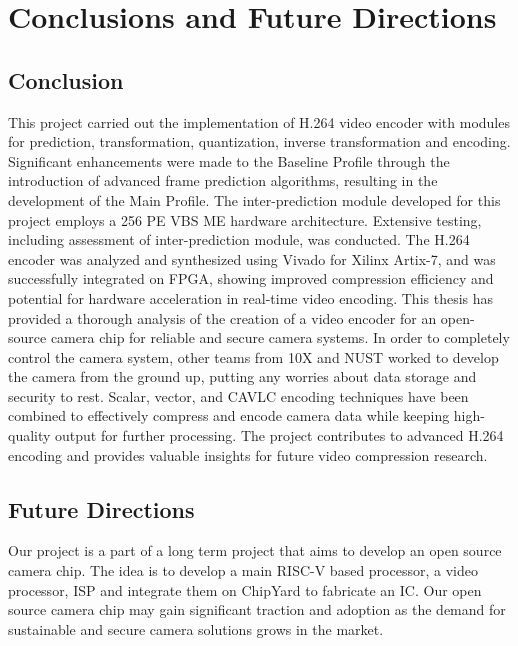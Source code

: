 
\chapter{Conclusions and Future Directions} %
\label{Chapter6}

\section{Conclusion}
This project carried out the implementation of H.264 video encoder with modules for prediction, transformation, quantization, inverse transformation and encoding.  Significant enhancements were made to the Baseline Profile through the introduction of advanced frame prediction algorithms, resulting in the development of the Main Profile. The inter-prediction module developed for this project employs a 256 PE VBS ME hardware architecture. Extensive testing, including assessment of inter-prediction module, was conducted. The H.264 encoder was analyzed and synthesized using Vivado for Xilinx Artix-7, and was successfully integrated on FPGA, showing improved compression efficiency and potential for hardware acceleration in real-time video encoding. This thesis has provided a thorough analysis of the creation of a video encoder for an open-source camera chip for reliable and secure camera systems. In order to completely control the camera system, other teams from 10X and NUST worked to develop the camera from the ground up, putting any worries about data storage and security to rest. Scalar, vector, and CAVLC encoding techniques have been combined to effectively compress and encode camera data while keeping high-quality output for further processing. The project contributes to advanced H.264 encoding and provides valuable insights for future video compression research.

\section{Future Directions}
Our project is a part of a long term project that aims to develop an open source camera chip. The idea is to develop a main RISC-V based processor, a video processor, ISP and integrate them on ChipYard to fabricate an IC. Our open source camera chip may gain significant traction and adoption as the demand for sustainable and secure camera solutions grows in the market.

